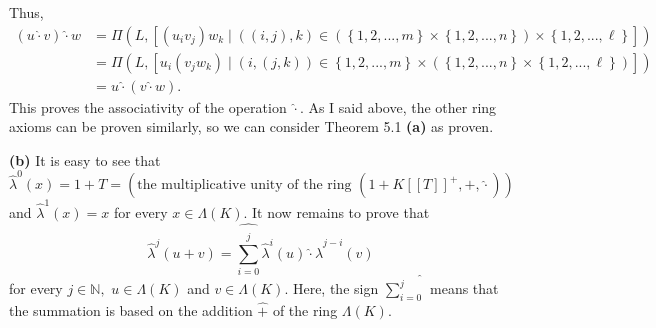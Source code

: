 \documentclass[numbers=enddot,12pt,final,onecolumn,notitlepage]{scrartcl}%
\begin{document}
Thus,%
\begin{align*}
\left(  u\widehat{\cdot}v\right)  \widehat{\cdot}w  &  =\Pi\left(  L,\left[
\left(  u_{i}v_{j}\right)  w_{k}\mid\left(  \left(  i,j\right)  ,k\right)
\in\left(  \left\{  1,2,...,m\right\}  \times\left\{  1,2,...,n\right\}
\right)  \times\left\{  1,2,...,\ell\right\}  \right]  \right) \\
&  =\Pi\left(  L,\left[  u_{i}\left(  v_{j}w_{k}\right)  \mid\left(  i,\left(
j,k\right)  \right)  \in\left\{  1,2,...,m\right\}  \times\left(  \left\{
1,2,...,n\right\}  \times\left\{  1,2,...,\ell\right\}  \right)  \right]
\right) \\
&  =u\widehat{\cdot}\left(  v\widehat{\cdot}w\right)  .
\end{align*}
This proves the associativity of the operation $\widehat{\cdot}$. As I said
above, the other ring axioms can be proven similarly, so we can consider
Theorem 5.1 \textbf{(a)} as proven.

\textbf{(b)} It is easy to see that $\widehat{\lambda}^{0}\left(  x\right)
=1+T=\left(  \text{the multiplicative unity of the ring }\left(  1+K\left[
\left[  T\right]  \right]  ^{+},\widehat{+},\widehat{\cdot}\right)  \right)  $
and $\widehat{\lambda}^{1}\left(  x\right)  =x$ for every $x\in\Lambda\left(
K\right)  $. It now remains to prove that%
\begin{equation}
\widehat{\lambda}^{j}\left(  u+v\right)  =\widehat{\sum_{i=0}^{j}%
}\widehat{\lambda}^{i}\left(  u\right)  \widehat{\cdot}\widehat{\lambda}%
^{j-i}\left(  v\right)  \label{SpezLemma1}%
\end{equation}
for every $j\in\mathbb{N},$ $u\in\Lambda\left(  K\right)  $ and $v\in
\Lambda\left(  K\right)  .$ Here, the sign $\widehat{\sum\limits_{i=0}^{j}}$
means that the summation is based on the addition $\widehat{+}$ of the ring
$\Lambda\left(  K\right)  $.
\end{document}
